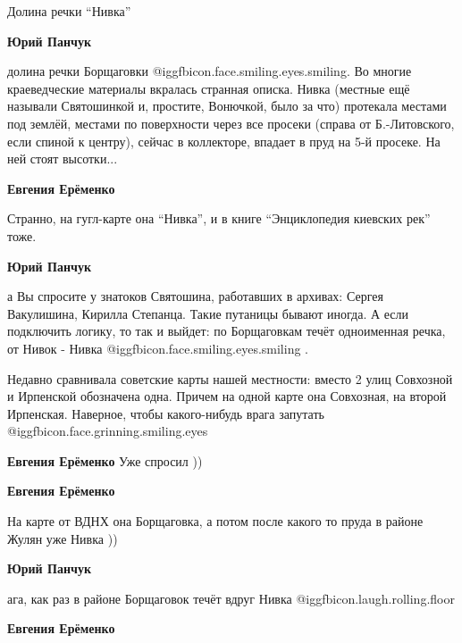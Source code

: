  
 
 
 
 

Долина речки \enquote{Нивка}

\textbf{Юрий Панчук} 

долина речки Борщаговки  @igg{fbicon.face.smiling.eyes.smiling}. Во многие
краеведческие материалы вкралась странная описка. Нивка (местные ещё называли
Святошинкой и, простите, Вонючкой, было за что) протекала местами под землёй,
местами по поверхности через все просеки (справа от Б.-Литовского, если спиной
к центру), сейчас в коллекторе, впадает в пруд на 5-й просеке. На ней стоят
высотки...

\textbf{Евгения Ерёменко} 

Странно, на гугл-карте она \enquote{Нивка}, и в книге \enquote{Энциклопедия
киевских рек} тоже.

\textbf{Юрий Панчук} 

а Вы спросите у знатоков Святошина, работавших в архивах: Сергея Вакулишина,
Кирилла Степанца. Такие путаницы бывают иногда. А если подключить логику, то
так и выйдет: по Борщаговкам течёт одноименная речка, от Нивок - Нивка
@igg{fbicon.face.smiling.eyes.smiling} .

Недавно сравнивала советские карты нашей местности: вместо 2 улиц Совхозной и
Ирпенской обозначена одна. Причем на одной карте она Совхозная, на второй
Ирпенская. Наверное, чтобы какого-нибудь врага запутать
@igg{fbicon.face.grinning.smiling.eyes} 


\textbf{Евгения Ерёменко} Уже спросил ))

\textbf{Евгения Ерёменко} 

На карте от ВДНХ она Борщаговка, а потом после какого то пруда в районе Жулян
уже Нивка ))

\textbf{Юрий Панчук} 

ага, как раз в районе Борщаговок течёт вдруг Нивка
@igg{fbicon.laugh.rolling.floor} 

\textbf{Евгения Ерёменко} 

